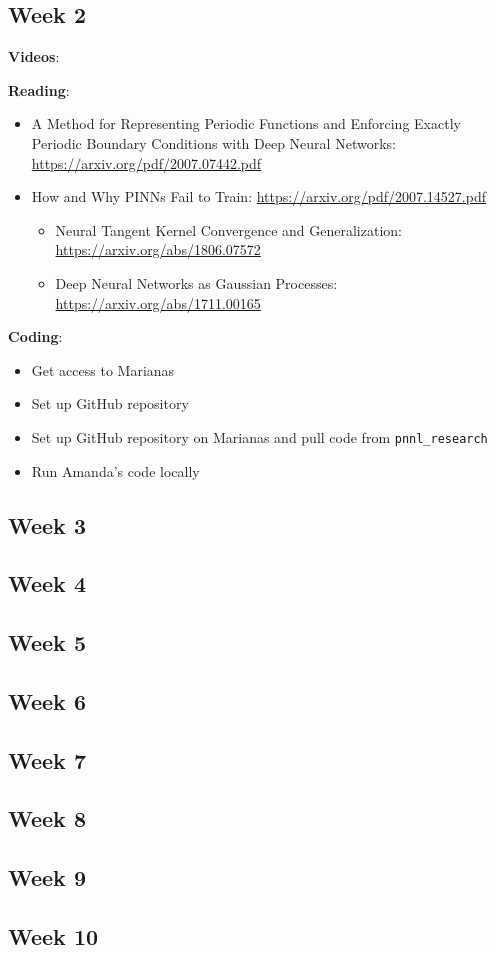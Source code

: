 \documentclass{article}
\def\bf{\textbf}
\begin{document}
\subsection*{Week 2}
\bf{Videos}:

\bf{Reading}:
\begin{itemize}
	\item A Method for Representing Periodic Functions and Enforcing Exactly Periodic Boundary Conditions with Deep Neural Networks: \url{https://arxiv.org/pdf/2007.07442.pdf}
	\item How and Why PINNs Fail to Train: \url{https://arxiv.org/pdf/2007.14527.pdf}
	\begin{itemize}
		\item Neural Tangent Kernel Convergence and Generalization: \url{https://arxiv.org/abs/1806.07572}
		\item Deep Neural Networks as Gaussian Processes: \url{https://arxiv.org/abs/1711.00165}
	\end{itemize}
\end{itemize}
\bf{Coding}:
\begin{itemize}
\item Get access to Marianas
\item Set up GitHub repository
\item Set up GitHub repository on Marianas and pull code from \verb|pnnl_research|
\item Run Amanda's code locally
\end{itemize}
\newpage
\subsection*{Week 3} 
\subsection*{Week 4} 
\subsection*{Week 5} 
\subsection*{Week 6} 
\subsection*{Week 7} 
\subsection*{Week 8} 
\subsection*{Week 9}
\subsection*{Week 10}  
\end{document}
